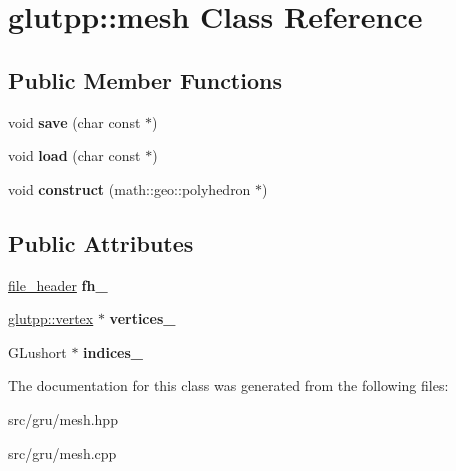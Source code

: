 \hypertarget{classglutpp_1_1mesh}{\section{glutpp\-:\-:mesh \-Class \-Reference}
\label{classglutpp_1_1mesh}
}
\subsection*{\-Public \-Member \-Functions}
\begin{DoxyCompactItemize}
\item 
\hypertarget{classglutpp_1_1mesh_a80555f3c7fe096015bbd3349742372cf}{void {\bfseries save} (char const $\ast$)}\label{classglutpp_1_1mesh_a80555f3c7fe096015bbd3349742372cf}

\item 
\hypertarget{classglutpp_1_1mesh_a15e84ee2548fc25bf38bf170d9ef1473}{void {\bfseries load} (char const $\ast$)}\label{classglutpp_1_1mesh_a15e84ee2548fc25bf38bf170d9ef1473}

\item 
\hypertarget{classglutpp_1_1mesh_a38ac06e9bf9628f098a1c59467163abc}{void {\bfseries construct} (math\-::geo\-::polyhedron $\ast$)}\label{classglutpp_1_1mesh_a38ac06e9bf9628f098a1c59467163abc}

\end{DoxyCompactItemize}
\subsection*{\-Public \-Attributes}
\begin{DoxyCompactItemize}
\item 
\hypertarget{classglutpp_1_1mesh_a53e047bbd2ec923b2e5d4690bc182687}{\hyperlink{structglutpp_1_1file__header}{file\-\_\-header} {\bfseries fh\-\_\-}}\label{classglutpp_1_1mesh_a53e047bbd2ec923b2e5d4690bc182687}

\item 
\hypertarget{classglutpp_1_1mesh_ae983b2dd19dc6d0d13b86e8605e4d3db}{\hyperlink{structglutpp_1_1vertex}{glutpp\-::vertex} $\ast$ {\bfseries vertices\-\_\-}}\label{classglutpp_1_1mesh_ae983b2dd19dc6d0d13b86e8605e4d3db}

\item 
\hypertarget{classglutpp_1_1mesh_ad928372133364a0a0ed57d47ccee7ca1}{\-G\-Lushort $\ast$ {\bfseries indices\-\_\-}}\label{classglutpp_1_1mesh_ad928372133364a0a0ed57d47ccee7ca1}

\end{DoxyCompactItemize}


\-The documentation for this class was generated from the following files\-:\begin{DoxyCompactItemize}
\item 
src/gru/mesh.\-hpp\item 
src/gru/mesh.\-cpp\end{DoxyCompactItemize}
